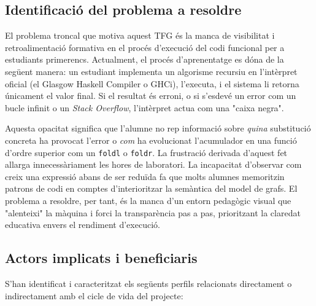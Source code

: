 \subsection{Identificació del problema a resoldre}
El problema troncal que motiva aquest TFG és la manca de visibilitat i retroalimentació formativa en el procés d'execució del codi funcional per a estudiants primerencs. Actualment, el procés d'aprenentatge es dóna de la següent manera: un estudiant implementa un algorisme recursiu en l'intèrpret oficial (el Glasgow Haskell Compiler o GHCi), l'executa, i el sistema li retorna únicament el valor final. Si el resultat és erroni, o si s'esdevé un error com un bucle infinit o un \textit{Stack Overflow}, l'intèrpret actua com una "caixa negra". 

Aquesta opacitat significa que l'alumne no rep informació sobre \textit{quina} substitució concreta ha provocat l'error o \textit{com} ha evolucionat l'acumulador en una funció d'ordre superior com un \texttt{foldl} o \texttt{foldr}. La frustració derivada d'aquest fet allarga innecessàriament les hores de laboratori. La incapacitat d'observar com creix una expressió abans de ser reduïda fa que molts alumnes memoritzin patrons de codi en comptes d'interioritzar la semàntica del model de grafs. El problema a resoldre, per tant, és la manca d'un entorn pedagògic visual que "alenteixi" la màquina i forci la transparència pas a pas, prioritzant la claredat educativa envers el rendiment d'execució.

\subsection{Actors implicats i beneficiaris}
S'han identificat i caracteritzat els següents perfils relacionats directament o indirectament amb el cicle de vida del projecte:

